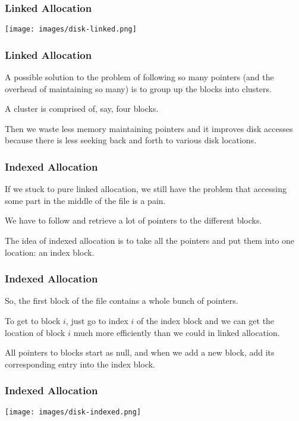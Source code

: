 \begin{frame}
	\frametitle{Linked Allocation}

	\begin{center}
		\texttt{[image: images/disk-linked.png]}
	\end{center}

\end{frame}

\begin{frame}
	\frametitle{Linked Allocation}

	A possible solution to the problem of following so many pointers (and the overhead of maintaining so many) is to group up the blocks into \alert{clusters}.

	A cluster is comprised of, say, four blocks.

	Then we waste less memory maintaining pointers and it improves disk accesses because there is less seeking back and forth to various disk locations.

\end{frame}

\begin{frame}
	\frametitle{Indexed Allocation}

	If we stuck to pure linked allocation, we still have the problem that accessing some part in the middle of the file is a pain.

	We have to follow and retrieve a lot of pointers to the different blocks.

	The idea of indexed allocation is to take all the pointers and put them into one location: an index block.


\end{frame}



\begin{frame}
	\frametitle{Indexed Allocation}

	So, the first block of the file contains a whole bunch of pointers.

	To get to block $i$, just go to index $i$ of the index block and we can get the location of block $i$ much more efficiently than we could in linked allocation.

	All pointers to blocks start as null, and when we add a new block, add its corresponding entry into the index block.

\end{frame}

\begin{frame}
	\frametitle{Indexed Allocation}

	\begin{center}
		\texttt{[image: images/disk-indexed.png]}
	\end{center}


\end{frame}

